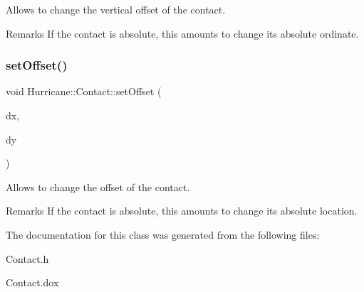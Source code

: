 Allows to change the vertical offset of the contact.

\begin{DoxyRemark}{Remarks}
If the contact is absolute, this amounts to change its absolute ordinate. 
\end{DoxyRemark}
\mbox{\label{classHurricane_1_1Contact_a41ba972136e77d768f58ad0407d18f8e}} 
\subsubsection{\texorpdfstring{set\+Offset()}{setOffset()}}
{\footnotesize\ttfamily void Hurricane\+::\+Contact\+::set\+Offset (\begin{DoxyParamCaption}\item[{const \mbox{\hyperlink{group__DbUGroup_ga4fbfa3e8c89347af76c9628ea06c4146}{Db\+U\+::\+Unit}} \&}]{dx,  }\item[{const \mbox{\hyperlink{group__DbUGroup_ga4fbfa3e8c89347af76c9628ea06c4146}{Db\+U\+::\+Unit}} \&}]{dy }\end{DoxyParamCaption})}

Allows to change the offset of the contact.

\begin{DoxyRemark}{Remarks}
If the contact is absolute, this amounts to change its absolute location. 
\end{DoxyRemark}


The documentation for this class was generated from the following files\+:\begin{DoxyCompactItemize}
\item 
Contact.\+h\item 
Contact.\+dox\end{DoxyCompactItemize}
